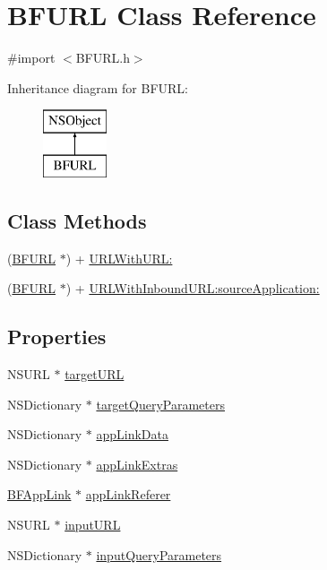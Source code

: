 \hypertarget{interface_b_f_u_r_l}{}\section{B\+F\+U\+R\+L Class Reference}
\label{interface_b_f_u_r_l}


{\ttfamily \#import $<$B\+F\+U\+R\+L.\+h$>$}

Inheritance diagram for B\+F\+U\+R\+L\+:\begin{figure}[H]
\begin{center}
\leavevmode
\includegraphics[height=2.000000cm]{interface_b_f_u_r_l}
\end{center}
\end{figure}
\subsection*{Class Methods}
\begin{DoxyCompactItemize}
\item 
(\hyperlink{interface_b_f_u_r_l}{B\+F\+U\+R\+L} $\ast$) + \hyperlink{interface_b_f_u_r_l_a0b209ec98da7b4e1f41a94c301fce3f8}{U\+R\+L\+With\+U\+R\+L\+:}
\item 
(\hyperlink{interface_b_f_u_r_l}{B\+F\+U\+R\+L} $\ast$) + \hyperlink{interface_b_f_u_r_l_a376fbc94419b0c0d496b08a395c98ab2}{U\+R\+L\+With\+Inbound\+U\+R\+L\+:source\+Application\+:}
\end{DoxyCompactItemize}
\subsection*{Properties}
\begin{DoxyCompactItemize}
\item 
N\+S\+U\+R\+L $\ast$ \hyperlink{interface_b_f_u_r_l_aa83698fb8e97cde89f07f2a27dd453b9}{target\+U\+R\+L}
\item 
N\+S\+Dictionary $\ast$ \hyperlink{interface_b_f_u_r_l_a874bc9b6e197567616676e7c35882312}{target\+Query\+Parameters}
\item 
N\+S\+Dictionary $\ast$ \hyperlink{interface_b_f_u_r_l_a7f41095ee721d9b4beae17f9fd9aafe5}{app\+Link\+Data}
\item 
N\+S\+Dictionary $\ast$ \hyperlink{interface_b_f_u_r_l_a47ef1fbe340b610c07b6f80e0c3c16ab}{app\+Link\+Extras}
\item 
\hyperlink{interface_b_f_app_link}{B\+F\+App\+Link} $\ast$ \hyperlink{interface_b_f_u_r_l_a0256b0b7763ce81aa3556c13d2363f57}{app\+Link\+Referer}
\item 
N\+S\+U\+R\+L $\ast$ \hyperlink{interface_b_f_u_r_l_a588a05e6eaedf5f9b17ce0f85edbef20}{input\+U\+R\+L}
\item 
N\+S\+Dictionary $\ast$ \hyperlink{interface_b_f_u_r_l_a03a744a57286fa44530dcfc5528fa49d}{input\+Query\+Parameters}
\end{DoxyCompactItemize}


